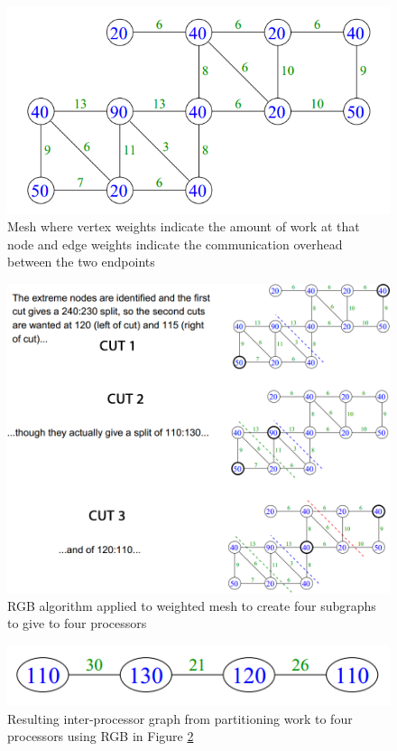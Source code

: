 \documentclass{article}
\begin{document}
\begin{figure}[H]
	\centering
	\includegraphics[scale=0.6]{figures/weighted-mesh.png}
	\caption{Mesh where vertex weights indicate the amount of work at that node and edge weights indicate the communication overhead between the two endpoints}
	\label{fig:weighted-mesh}
\end{figure}

\begin{figure}[H]
	\centering
	\includegraphics[scale=0.4]{figures/weighted-mesh-rgb-example.png}
	\caption{RGB algorithm applied to weighted mesh to create four subgraphs to give to four processors}
	\label{fig:weighted-mesh-rgb-example}
\end{figure}

\begin{figure}[H]
	\centering
	\includegraphics[scale=0.35==7]{figures/weighted-mesh-rgb-example-processor-graph.png}
	\caption{Resulting inter-processor graph from partitioning work to four processors using RGB in Figure \ref{fig:weighted-mesh-rgb-example}}
	\label{fig:weighted-mesh-rgb-example-processor-graph}
\end{figure}
\end{document}
